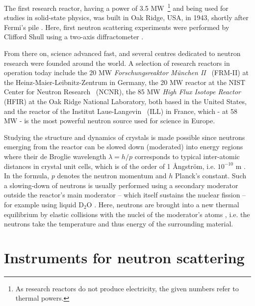 The first research reactor, having a power of 3.5 MW~\footnote{As research reactors do not produce electricity,
the given numbers refer to thermal powers.} and being used for studies in solid-state physics, was built in
Oak Ridge, USA, in 1943, shortly after Fermi's pile \cite[p. 3]{Jacrot2021}.
Here, first neutron scattering experiments were performed by Clifford Shull using a two-axis diffractometer \cite[pp. 3, 37]{Jacrot2021}.

From there on, science advanced fast, and several centres dedicated to neutron research were founded around the world.
A selection of research reactors in operation today include the 20 MW \textit{Forschungsreaktor M\"unchen II}~\cite{web_mlz}
(FRM-II) at the Heinz-Maier-Leibnitz-Zentrum in Germany,
the 20 MW reactor at the NIST Center for Neutron Research~\cite{web_nist} (NCNR),
the 85 MW \textit{High Flux Isotope Reactor}~\cite{web_oakridge} (HFIR) at the Oak Ridge National Laboratory,
both based in the United States,
and the reactor of the Institut Laue-Langevin~\cite{web_ill} (ILL) in France, which - at 58 MW - is the most
powerful neutron source used for science in Europe.

Studying the structure and dynamics of crystals is made possible since neutrons emerging from the reactor can be
slowed down (moderated) into energy regions where their de Broglie wavelength $\lambda = h/p$ \cite[p. 89]{Gross2012}
corresponds to typical inter-atomic distances in crystal unit cells, which is of the order of 1 \AA{}ngstr\"om,
i.e. $10^{-10}$ m \cite[pp.1,3]{Squires2012}. In the formula, $p$ denotes the neutron momentum and $h$ Planck's constant.
Such a slowing-down of neutrons is usually performed using a secondary moderator \cite[p. 10]{ExperimentalFacilites}
outside the reactor's main moderator -- which itself sustains the nuclear fission --
for example using liquid $\mathrm{D_2O}$ \cite[p. 82]{Jacrot2021}.
Here, neutrons are brought into a new thermal equilibrium by elastic collisions with the nuclei of the moderator's
atoms \cite[p. 30]{Stacey2007}, i.e. the neutrons take the temperature and thus energy of the surrounding material.



\section{Instruments for neutron scattering \label{sec:instruments}}

